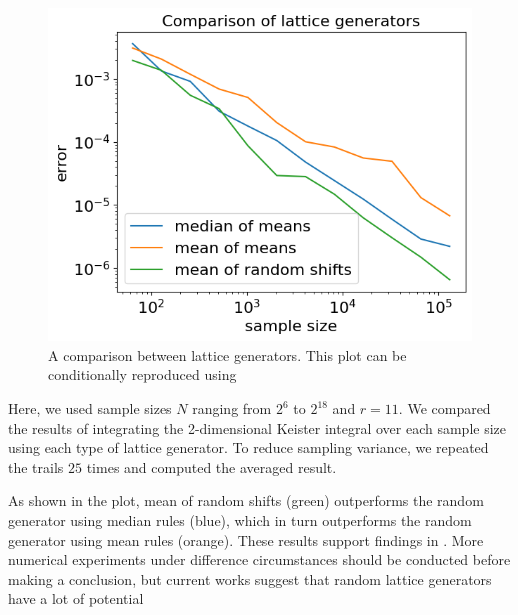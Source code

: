  \begin{figure}[H]
    \centering
    \includegraphics{TotallyRandomLattice/Figures/meanvsmedian.png}
    \caption{A comparison between lattice generators. This plot can be conditionally reproduced using }
\end{figure}

Here, we used sample sizes $N$ ranging from $2^6$ to $2^{18}$ and $r = 11$. We compared the results of integrating the 2-dimensional Keister integral over each sample size using each type of lattice generator. To reduce sampling variance, we repeated the trails $25$ times and computed the averaged result. 

As shown in the plot, mean of random shifts (green) outperforms the random generator using median rules (blue), which in turn outperforms the random generator using mean rules (orange). These results support findings in \cite{doi:10.1137/22M1473625}. More numerical experiments under difference circumstances should be conducted before making a conclusion, but current works suggest that random lattice generators have a lot of potential 



